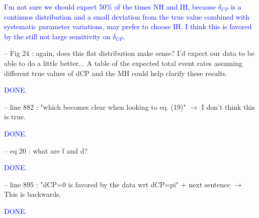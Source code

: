 \documentclass[final]{elsarticle}
\begin{document}
\textcolor{blue}{
I'm not sure we should expect 50\% of the times NH and IH,
because $\delta_{CP}$ is a continuos distribution and a small
deviation from the true value combined with systematic parameter variations, may prefer to choose IH.
I think this is favored by the still not large sensitivity on $\delta_{CP}$.
}

-- Fig 24 : again, does this flat distribution make sense?  I'd expect our data
to be able to do a little better... A table of the expected total event rates
assuming different true values of dCP and the MH could help clarify these
results.

\textcolor{blue}{DONE.}

-- line 882 : "which becomes clear when looking to eq. (19)" $\rightarrow$ I don't think
this is true.

\textcolor{blue}{DONE.}

-- eq 20 : what are f and d?

\textcolor{blue}{DONE.}

-- line 895 : "dCP=0 is favored by the data wrt dCP=pi" + next sentence $\rightarrow$ This
is backwards.

\textcolor{blue}{DONE.}
\end{document}
